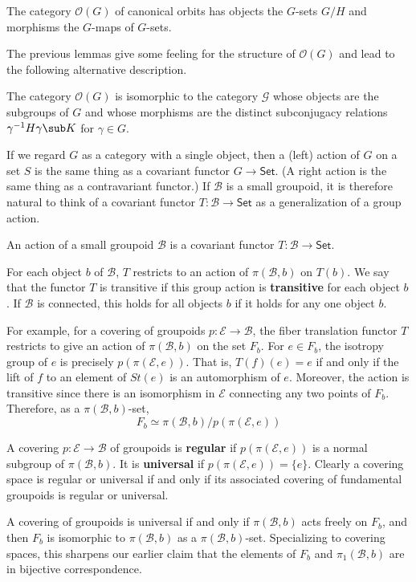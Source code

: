 \begin{definition}
The category $\mathcal{O}(G)$ of canonical orbits has objects the $G$-sets
$G/H$ and morphisms the $G$-maps of $G$-sets.
\end{definition}
The previous lemmas give some feeling for the structure of $\mathcal{O}(G)$ and lead to the following alternative description.
\begin{lemma}
The category $\mathcal{O}(G)$ is isomorphic to the category $\mathcal{G}$ whose objects are the subgroups of $G$ and whose morphisms are the distinct subconjugacy relations $\gamma^{-1}H\gamma\sub K$ for $\gamma\in G$.
\end{lemma}
If we regard $G$ as a category with a single object, then a (left) action of $G$ on a set $S$ is the same thing as a covariant functor $G\to\mathsf{Set}$. (A right action is the same thing as a contravariant functor.) If $\mathcal{B}$ is a small groupoid, it is therefore natural to think of a covariant functor $T:\mathcal{B}\to\mathsf{Set}$ as a generalization of a group action.
\begin{definition}
An action of a small groupoid $\mathcal{B}$ is a covariant functor $T:\mathcal{B}\to\mathsf{Set}$.
\end{definition}
For each object $b$ of $\mathcal{B}$, $T$ restricts to an action of $\pi(\mathcal{B},b)$ on $T(b)$. We say that the functor $T$ is transitive if this group action is \textbf{transitive} for each object $b$. If $\mathcal{B}$ is connected, this holds for all objects $b$ if it holds for any one object $b$.\par
For example, for a covering of groupoids $p:\mathcal{E}\to\mathcal{B}$, the fiber translation functor $T$ restricts to give an action of $\pi(\mathcal{B},b)$ on the set $F_b$. For $e\in F_b$, the isotropy group of $e$ is precisely $p(\pi(\mathcal{E},e))$. That is, $T(f)(e)=e$ if and only if the lift of $f$ to an element of $St(e)$ is an automorphism of $e$. Moreover, the action is transitive since there is an isomorphism in $\mathcal{E}$ connecting any two points of $F_b$. Therefore, as a $\pi(\mathcal{B},b)$-set,
\[F_b\simeq\pi(\mathcal{B},b)/p(\pi(\mathcal{E},e))\]
\begin{definition}
A covering $p:\mathcal{E}\to\mathcal{B}$ of groupoids is \textbf{regular} if $p(\pi(\mathcal{E},e))$ is a normal subgroup of $\pi(\mathcal{B},b)$. It is \textbf{universal} if $p(\pi(\mathcal{E},e))=\{e\}$. Clearly a covering space is regular or universal if and only if its associated covering of fundamental groupoids is regular or universal.
\end{definition}
A covering of groupoids is universal if and only if $\pi(\mathcal{B},b)$ acts freely on $F_b$, and then $F_b$ is isomorphic to $\pi(\mathcal{B},b)$ as a $\pi(\mathcal{B},b)$-set. Specializing to covering spaces, this sharpens our earlier claim that the elements of $F_b$ and $\pi_1(\mathcal{B},b)$ are in bijective correspondence.
